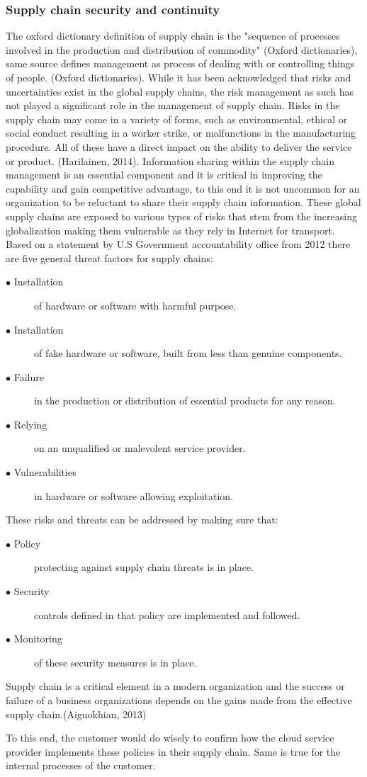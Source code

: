 \documentclass{article}
\begin{document}
\subsubsection{Supply chain security and continuity}
The oxford dictionary definition of supply chain is the "sequence of processes involved in the production and distribution of commodity" (Oxford dictionaries), same source defines management as process of dealing with or controlling things of people. (Oxford dictionaries). 
While it has been acknowledged that risks and uncertainties exist in the global supply chains, the risk management as such has not played a significant role in the management of supply chain. Risks in the supply chain may come in a variety of forms, such as environmental, ethical or social conduct resulting in a worker strike, or malfunctions in the manufacturing procedure. All of these have a direct impact on the ability to deliver the service or product. (Harilainen, 2014).
Information sharing within the supply chain management is an essential component and it is critical in improving the capability and gain competitive advantage, to this end it is not uncommon for an organization to be reluctant to share their supply chain information. These global supply chains are exposed to various types of risks that stem from the increasing globalization making them vulnerable as they rely in Internet for transport. Based on a statement by U.S Government accountability office from 2012 there are five general threat factors for supply chains:
\begin{description}
	\item[$\bullet$ Installation] of hardware or software with harmful purpose.
	\item[$\bullet$ Installation] of fake hardware or software, built from less than genuine components.
	\item[$\bullet$ Failure] in the production or distribution of essential products for any reason.
	\item[$\bullet$ Relying] on an unqualified or malevolent service provider.
	\item[$\bullet$ Vulnerabilities] in hardware or software allowing exploitation.
\end{description}
These risks and threats can be addressed by making sure that:
\begin{description}
	\item[$\bullet$ Policy] protecting against supply chain threats is in place.
	\item[$\bullet$ Security] controls defined in that policy are implemented and followed.
	\item[$\bullet$ Monitoring] of these security measures is in place.
\end{description}
Supply chain is a critical element in a modern organization and the success or failure of a business organizations depends on the gains made from the effective supply chain.(Aiguokhian, 2013)
\par
To this end, the customer would do wisely to confirm how the cloud service provider implements these policies in their supply chain. Same is true for the internal processes of the customer. 
\end{document}
